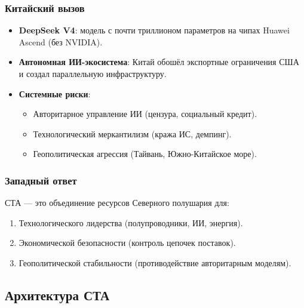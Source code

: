 \documentclass[11pt, a4paper]{article}
\begin{document}
\subsubsection*{Китайский вызов}
\begin{itemize}
    \item \textbf{DeepSeek V4}: модель с почти триллионом параметров на чипах Huawei Ascend (без NVIDIA).
    \item \textbf{Автономная ИИ-экосистема}: Китай обошёл экспортные ограничения США и создал параллельную инфраструктуру.
    \item \textbf{Системные риски}:
    \begin{itemize}
        \item Авторитарное управление ИИ (цензура, социальный кредит).
        \item Технологический меркантилизм (кража ИС, демпинг).
        \item Геополитическая агрессия (Тайвань, Южно-Китайское море).
    \end{itemize}
\end{itemize}

\subsubsection*{Западный ответ}
СТА --- это объединение ресурсов Северного полушария для:
\begin{enumerate}
    \item Технологического лидерства (полупроводники, ИИ, энергия).
    \item Экономической безопасности (контроль цепочек поставок).
    \item Геополитической стабильности (противодействие авторитарным моделям).
\end{enumerate}

\subsection{Архитектура СТА}
\end{document}
